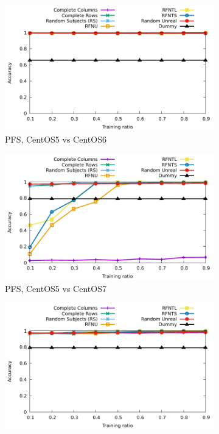 \documentclass[10pt, conference, compsocconf]{IEEEtran}
\begin{document}
\begin{figure}
\begin{subfigure}[b]{\columnwidth}
        \includegraphics[width=0.8\columnwidth]{data/results/means_of_results/ALS-Bias/PreFreeSurfer/ALS-Bias-PFS-5v6.pdf}
        \caption{PFS, CentOS5 vs CentOS6}
\end{subfigure}
\begin{subfigure}[b]{\columnwidth}
        \includegraphics[width=0.8\columnwidth]{data/results/means_of_results/ALS-Bias/PreFreeSurfer/ALS-Bias-PFS-5v7.pdf}
        \caption{PFS, CentOS5 vs CentOS7}
        \label{fig:pfs-c5vsc7-bias}
\end{subfigure}
\begin{subfigure}[b]{\columnwidth}
        \includegraphics[width=0.8\columnwidth]{data/results/means_of_results/ALS-Bias/PreFreeSurfer/ALS-Bias-PFS-6v7.pdf}

\end{subfigure}
\end{figure}
\end{document}
